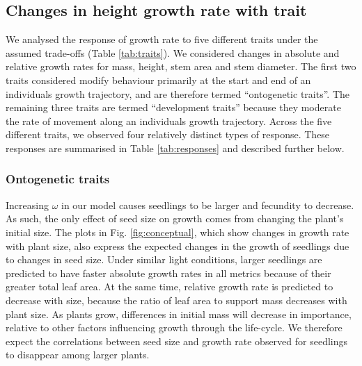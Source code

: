 \documentclass[a4paper,11pt]{article}
\begin{document}

\subsection{Changes in height growth rate with trait}

We analysed the response of growth rate to five different traits under the assumed trade-offs (Table \ref{tab:traits}). We considered changes in absolute and relative growth rates for mass, height, stem area and stem diameter. The first two traits considered modify behaviour primarily at the start and end of an individuals growth trajectory, and are therefore termed ``ontogenetic traits''. The remaining three traits are termed ``development traits'' because they moderate the rate of movement along an individuals growth trajectory. Across the five different traits, we observed four relatively distinct types of response. These responses are summarised in Table \ref{tab:responses} and described further below.

\subsubsection{Ontogenetic traits}

Increasing $\omega$ in our model causes seedlings to be larger and fecundity to decrease. As such, the only effect of seed size on growth comes from changing the plant's initial  size. The plots in Fig. \ref{fig:conceptual}, which show changes in growth rate with plant size, also express the expected changes in the growth of seedlings due to changes in seed size. Under similar light conditions, larger seedlings are predicted to have faster absolute growth rates in all metrics  because of their greater total leaf area. At the same time, relative growth rate is predicted to decrease with size, because the ratio of leaf area to support mass decreases with plant size. As plants grow, differences in initial mass will decrease in importance, relative to other factors influencing growth through the life-cycle. We therefore expect the correlations between seed size and growth rate observed for seedlings to disappear among larger plants.
\end{document}
